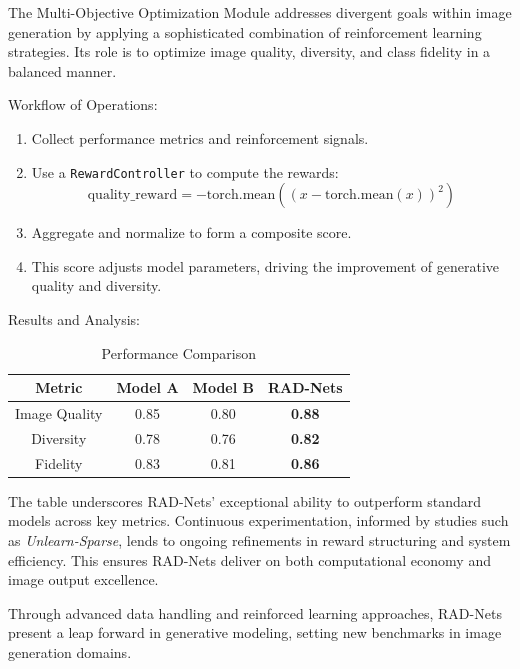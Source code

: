 The Multi-Objective Optimization Module addresses divergent goals within image generation by applying a sophisticated combination of reinforcement learning strategies. Its role is to optimize image quality, diversity, and class fidelity in a balanced manner.

Workflow of Operations:
\begin{enumerate}
    \item Collect performance metrics and reinforcement signals.
    \item Use a \texttt{RewardController} to compute the rewards:
    \[
    \text{quality\_reward} = -\text{torch.mean}\left((x - \text{torch.mean}(x))^2\right)
    \]
    \item Aggregate and normalize to form a composite score.
    \item This score adjusts model parameters, driving the improvement of generative quality and diversity.
\end{enumerate}

Results and Analysis:

\begin{table}[h]
\centering
\begin{tabular}{|c|c|c|c|}
\hline
\textbf{Metric} & \textbf{Model A} & \textbf{Model B} & \textbf{RAD-Nets} \\ \hline
Image Quality & 0.85 & 0.80 & \textbf{0.88} \\ \hline
Diversity & 0.78 & 0.76 & \textbf{0.82} \\ \hline
Fidelity & 0.83 & 0.81 & \textbf{0.86} \\ \hline
\end{tabular}
\caption{Performance Comparison}
\end{table}

The table underscores RAD-Nets' exceptional ability to outperform standard models across key metrics. Continuous experimentation, informed by studies such as \textit{Unlearn-Sparse}, lends to ongoing refinements in reward structuring and system efficiency. This ensures RAD-Nets deliver on both computational economy and image output excellence.

Through advanced data handling and reinforced learning approaches, RAD-Nets present a leap forward in generative modeling, setting new benchmarks in image generation domains.
